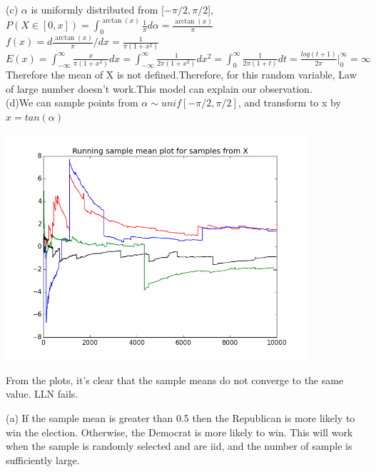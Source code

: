 \documentclass[11pt]{article}
\newenvironment{problem}[2][Problem]{\begin{trivlist}
\item[\hskip \labelsep {\bfseries #1}\hskip \labelsep {\bfseries #2.}]}{\end{trivlist}}
\begin{document}
(c) $\alpha$ is uniformly distributed from [$-\pi/2, \pi/2$], $P(X \in [0,x]) = \int_{0}^{\arctan(x)} \frac{1}{\pi} d\alpha = \frac{\arctan(x)}{\pi}$\\
$f(x) = d \frac{\arctan(x)}{\pi}/dx = \frac{1}{\pi(1+x^2)}$\\
$E(x) = \int_{-\infty}^{\infty}\frac{x}{\pi(1+x^2) }dx = \int_{-\infty}^{\infty}\frac{1}{2\pi(1+x^2) }dx^2  = \int_{0}^{\infty}\frac{1}{2\pi(1+t) }dt = \frac{log(t+1)}{2\pi} |_{0}^{\infty} = \infty$\\
Therefore the mean of X is not defined.Therefore, for this random variable, Law of large number doesn't work.This model can explain our observation.\\

(d)We can sample points from $\alpha \sim unif[-\pi/2, \pi/2]$, and transform to x by $x = tan(\alpha)$

\begin{centering}
	\includegraphics[height = 3.3in]{Q4_c} 
	
\end{centering}
From the plots, it's clear that the sample means do not converge to the same value. LLN fails.\\

\begin{problem}{5}
\end{problem}
(a) If the sample mean is greater than 0.5 then the Republican is more likely to win the election. Otherwise, the Democrat is more likely to win. This will work when the sample is randomly selected and are iid, and the number of sample is sufficiently large.\\
\end{document}
